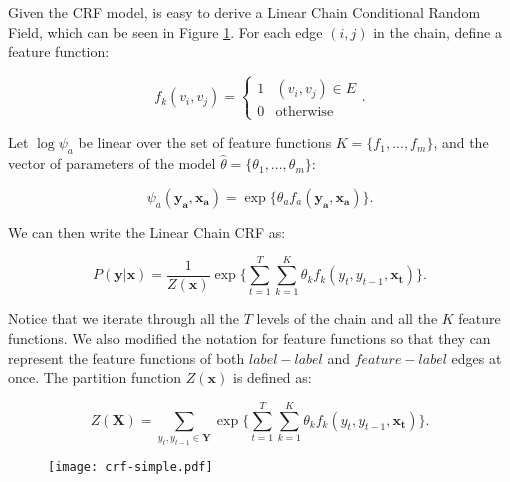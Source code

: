 \documentclass[10pt, conference]{IEEEtran}
\begin{document}
Given the CRF model, is easy to derive a Linear Chain Conditional Random Field, which can be seen in Figure \ref{crf-schema}. For each edge $(i,j)$ in the chain, define a feature function:

\begin{equation}
f_k(v_i,v_j) = 
\begin{cases}
1 &\text{$(v_i,v_j) \in E$}\\
0 &\text{otherwise}
\end{cases}.
\end{equation}


Let $\log \psi_a$ be linear over the set of feature functions $K=\{f_{1},...,f_m\}$, and the vector of parameters of the model $\hat{\theta}=\{\theta_{1},...,\theta_m\}$:

\begin{equation}
\label{factor}
\psi_a(\mathbf{y_a},\mathbf{x_a}) = 
\exp\Bigg\{
\theta_{a} f_{a}(\mathbf{y_a},\mathbf{x_a})
\Bigg\}.
\end{equation}

We can then write the Linear Chain CRF as:

\begin{equation}
\label{equationlinearchaincrf} 
P(\mathbf{y}|\mathbf{x}) = 
\frac{1}{Z(\mathbf{x})}
\exp
\Bigg\{\sum_{t=1}^T \sum_{k=1}^K \theta_kf_k(y_t,y_{t-1},\mathbf{x_t})\Bigg\}.
\end{equation}

Notice that we iterate through all the $T$ levels of the chain and all the $K$ feature functions. We also modified the notation for feature functions so that they can represent the feature functions of both $label-label$ and $feature-label$ edges at once. The partition function $Z(\mathbf{x})$ is defined as:

\begin{equation}
\label{equationlinearchaincrffactor} 
Z(\mathbf{X}) = \sum_{{y_t,y_{t-1}} \in \mathbf{Y}}
\exp
\Bigg\{\sum_{t=1}^T \sum_{k=1}^K \theta_kf_k(y_t,y_{t-1},\mathbf{x_t})\Bigg\}.
\end{equation}


\begin{figure}[t]
	\begin{center}
		\texttt{[image: crf-simple.pdf]}
	\end{center}
	\label{crf-schema}
\end{figure}
\end{document}
